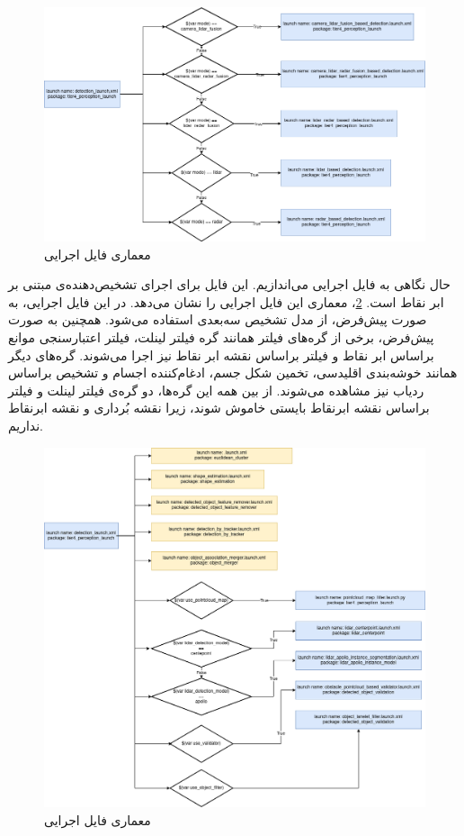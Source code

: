 \begin{figure}[h!]
    \centering
    \includegraphics[width=0.75\linewidth]{figures/detection_launch.png}
    \caption{معماری فایل‌ اجرایی }
    \label{fig:detection_launch}
\end{figure}

حال نگاهی به فایل اجرایی  می‌اندازیم. این فایل برای اجرای تشخیص‌دهنده‌ی مبتنی بر ابر نقاط است. \cref{fig:lidar_based_detection}، معماری این فایل اجرایی را نشان می‌دهد. در این فایل اجرایی، به صورت پیش‌فرض، از مدل تشخیص سه‌بعدی  استفاده می‌شود. همچنین به صورت پیش‌فرض، برخی از گره‌های فیلتر همانند گره فیلتر لینلت، فیلتر اعتبارسنجی موانع براساس ابر نقاط و فیلتر براساس نقشه ابر نقاط نیز اجرا می‌شوند. گره‌های دیگر همانند خوشه‌بندی اقلیدسی، تخمین شکل جسم، ادغام‌کننده اجسام و تشخیص براساس ردیاب نیز مشاهده می‌شوند. از بین همه این گره‌ها، دو گره‌ی فیلتر لینلت و فیلتر براساس نقشه ابرنقاط بایستی خاموش شوند، زیرا نقشه بُرداری و نقشه ابرنقاط نداریم. 

\begin{figure}[h!]
    \centering
    \includegraphics[width=0.7\linewidth]{figures/lidar_based_detection.png}
    \caption{معماری فایل‌ اجرایی }
    \label{fig:lidar_based_detection}
\end{figure}

